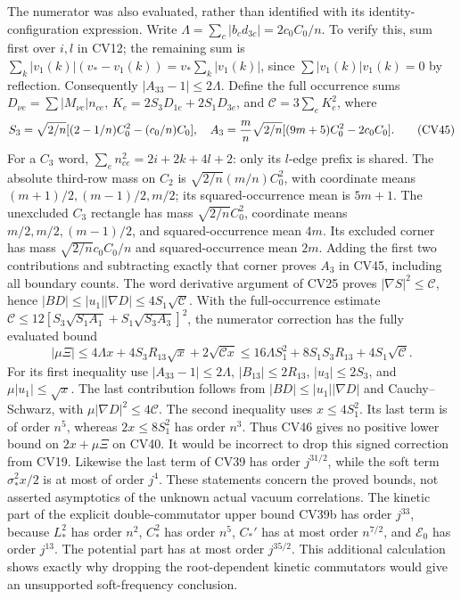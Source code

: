 \documentclass[11pt]{article}
\begin{document}
The numerator was also evaluated, rather than identified with its
identity-configuration expression. Write
\(\Lambda=\sum_c|b_cd_{3c}|=2c_0C_0/n\). To verify this, sum first
over \(i,l\) in CV12; the remaining sum is
\(\sum_k|v_1(k)|(v_*-v_1(k))=v_*\sum_k|v_1(k)|\),
since \(\sum|v_1(k)|v_1(k)=0\) by reflection.
Consequently \(|A_{33}-1|\le2\Lambda\). Define the full occurrence
sums \(D_{\nu e}=\sum|M_{\nu c}|n_{ce}\),
\(K_e=2S_3D_{1e}+2S_1D_{3e}\), and
\(\mathcal C=3\sum_eK_e^2\), where
\[
 S_3=\sqrt{2/n}[(2-1/n)C_0^2-(c_0/n)C_0],\quad
 A_3={m\over n}\sqrt{2/n}[(9m+5)C_0^2-2c_0C_0].        \tag{CV45}
\]
For a \(C_3\) word, \(\sum_en_{ce}^2=2i+2k+4l+2\):
only its \(l\)-edge prefix is shared. The absolute third-row mass
on \(C_2\) is \(\sqrt{2/n}(m/n)C_0^2\), with coordinate means
\((m+1)/2,(m-1)/2,m/2\); its squared-occurrence mean is \(5m+1\).
The unexcluded \(C_3\) rectangle has mass \(\sqrt{2/n}C_0^2\),
coordinate means \(m/2,m/2,(m-1)/2\), and squared-occurrence mean
\(4m\). Its excluded corner has mass
\(\sqrt{2/n}c_0C_0/n\) and squared-occurrence mean \(2m\).
Adding the first two contributions and subtracting exactly that
corner proves \(A_3\) in CV45, including all boundary counts.
The word derivative argument of CV25 proves
\(|\nabla S|^2\le\mathcal C\), hence
\(|BD|\le|u_1||\nabla D|\le4S_1\sqrt{\mathcal C}\).
With the full-occurrence estimate
\(\mathcal C\le12[S_3\sqrt{S_1A_1}+S_1\sqrt{S_3A_3}]^2\),
the numerator correction has the fully evaluated bound
\[
 |\mu\Xi|\le4\Lambda x+4S_3R_{13}\sqrt x
                               +2\sqrt{\mathcal C x}
 \le16\Lambda S_1^2+8S_1S_3R_{13}
                               +4S_1\sqrt{\mathcal C}.  \tag{CV46}
\]
For its first inequality use \(|A_{33}-1|\le2\Lambda\),
\(|B_{13}|\le2R_{13}\), \(|u_3|\le2S_3\), and
\(\mu|u_1|\le\sqrt x\). The last contribution follows from
\(|BD|\le|u_1||\nabla D|\) and Cauchy--Schwarz, with
\(\mu|\nabla D|^2\le4\mathcal C\). The second inequality uses
\(x\le4S_1^2\).
Its last term is of order \(n^5\), whereas \(2x\le8S_1^2\) has
order \(n^3\). Thus CV46 gives no positive lower bound on \(2x+\mu\Xi\)
on CV40. It would be incorrect to drop this signed correction from
CV19. Likewise the last term of CV39 has order \(j^{31/2}\), while
the soft term \(\sigma_*^2x/2\) is at most of order \(j^4\).
These statements concern the proved bounds, not asserted asymptotics
of the unknown actual vacuum correlations.
The kinetic part of the explicit double-commutator upper bound CV39b
has order \(j^{33}\), because \(L_*^2\) has order \(n^2\),
\(C_*^2\) has order \(n^5\), \(C_*'\) has at most order \(n^{7/2}\),
and \(\mathcal E_0\) has order \(j^{13}\). The potential part has
at most order \(j^{35/2}\). This additional calculation shows exactly
why dropping the root-dependent kinetic commutators would give an
unsupported soft-frequency conclusion.
\end{document}
